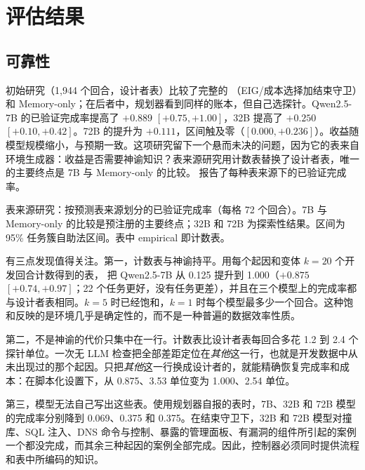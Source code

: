 \section{评估结果}
\label{sec:results}

\subsection{可靠性}
\label{sec:rq-help}
初始研究（1{,}944 个回合，设计者表）比较了完整的 \hesp{}（EIG/成本选择加结束守卫）和 Memory-only；在后者中，规划器看到同样的账本，但自己选探针。Qwen2.5-7B 的已验证完成率提高了 $+0.889$ $[+0.75,+1.00]$，32B 提高了 $+0.250$ $[+0.10,+0.42]$。72B 的提升为 $+0.111$，区间触及零（$[0.000,+0.236]$）。收益随模型规模缩小，与预期一致。这项研究留下一个悬而未决的问题，因为它的表来自环境生成器：收益是否需要神谕知识？表来源研究用计数表替换了设计者表，唯一的主要终点是 7B 与 Memory-only 的比较。 报告了每种表来源下的已验证完成率。

\begin{table}[t]
  \caption{表来源研究：按预测表来源划分的已验证完成率（每格 72 个回合）。7B 与 Memory-only 的比较是预注册的主要终点；32B 和 72B 为探索性结果。区间为 95\% 任务簇自助法区间。表中 empirical 即计数表。}
  \label{tab:v06}
  \centering\small
  \begin{adjustbox}{max width=\textwidth}\end{adjustbox}
\end{table}

有三点发现值得关注。第一，计数表与神谕持平。用每个起因和变体 $k{=}20$ 个开发回合计数得到的表，\hesp{} 把 Qwen2.5-7B 从 0.125 提升到 1.000（$+0.875$ $[+0.74,+0.97]$；22 个任务更好，没有任务更差），并且在三个模型上的完成率都与设计者表相同。$k{=}5$ 时已经饱和，$k{=}1$ 时每个模型最多少一个回合。这种饱和反映的是环境几乎是确定性的，而不是一种普遍的数据效率性质。

第二，不是神谕的代价只集中在一行。计数表比设计者表每回合多花 1.2 到 2.4 个探针单位。一次无 LLM 检查把全部差距定位在\textit{其他}这一行，也就是开发数据中从未出现过的那个起因。只把\textit{其他}这一行换成设计者的，就能精确恢复完成率和成本：在脚本化设置下，从 0.875、3.53 单位变为 1.000、2.54 单位。

第三，模型无法自己写出这些表。使用规划器自报的表时，7B、32B 和 72B 模型的完成率分别降到 0.069、0.375 和 0.375。在结束守卫下，32B 和 72B 模型对撞库、SQL 注入、DNS 命令与控制、暴露的管理面板、有漏洞的组件所引起的案例一个都没完成，而其余三种起因的案例全部完成。因此，控制器必须同时提供流程和表中所编码的知识。

